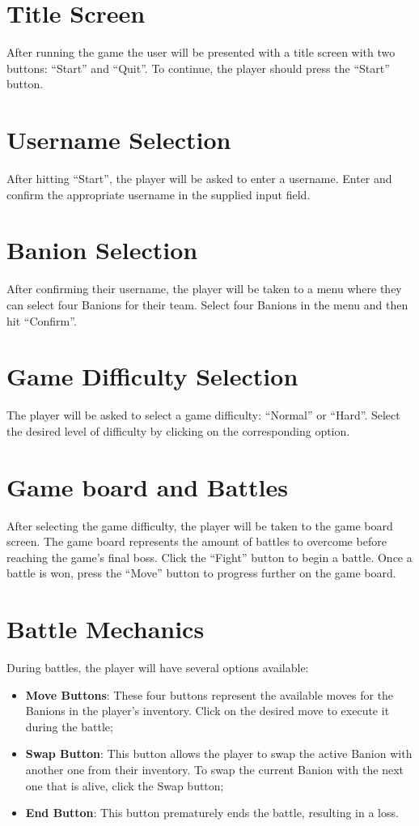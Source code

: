 \documentclass[12pt, a4paper]{report}
\theoremstyle{definition}
\begin{document}
\section{Title Screen}
After running the game the user will be presented with a title screen with two buttons: ``Start'' and ``Quit''. To continue, the player should press the ``Start'' button.

\section{Username Selection}
After hitting ``Start'', the player will be asked to enter a username. Enter and confirm the appropriate username in the supplied input field.

\section{Banion Selection}
After confirming their username, the player will be taken to a menu where they can select four Banions for their team.
Select four Banions in the menu and then hit ``Confirm''.

\section{Game Difficulty Selection}
The player will be asked to select a game difficulty: ``Normal'' or ``Hard''. Select the desired level of difficulty by clicking on the corresponding option.

\section{Game board and Battles}
After selecting the game difficulty, the player will be taken to the game board screen. The game board represents the amount of battles to overcome before reaching the game's final boss.
Click the ``Fight'' button to begin a battle. Once a battle is won, press the ``Move'' button to progress further on the game board.

\section{Battle Mechanics}
During battles, the player will have several options available:
\begin{itemize}
  \item \textbf{Move Buttons}: These four buttons represent the available moves for the Banions in the player's inventory. Click on the desired move to execute it during the battle;
  \item \textbf{Swap Button}: This button allows the player to swap the active Banion with another one from their inventory. To swap the current Banion with the next one that is alive, click the Swap button;
  \item \textbf{End Button}: This button prematurely ends the battle, resulting in a loss.
\end{itemize}
\end{document}

